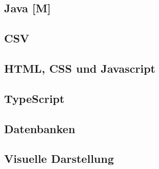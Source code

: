 

\begin{spacing}{1}
    \section{Java [M]}\label{section:allTechJava}
    \end{spacing}


\begin{spacing}{1}
    \section{CSV}\label{section:allTechCSV}
    \end{spacing}


\begin{spacing}{1}
    \section{HTML, CSS und Javascript}\label{section:allTechHTMLCSS}
    \end{spacing}

 
\begin{spacing}{1}
    \section{TypeScript}\label{section:allTechTypescript}
    \end{spacing}

 
\begin{spacing}{1}
    \section{Datenbanken}\label{section:database}
    \end{spacing}


\begin{spacing}{1}
    \section{Visuelle Darstellung}\label{section:gui}
    \end{spacing}


